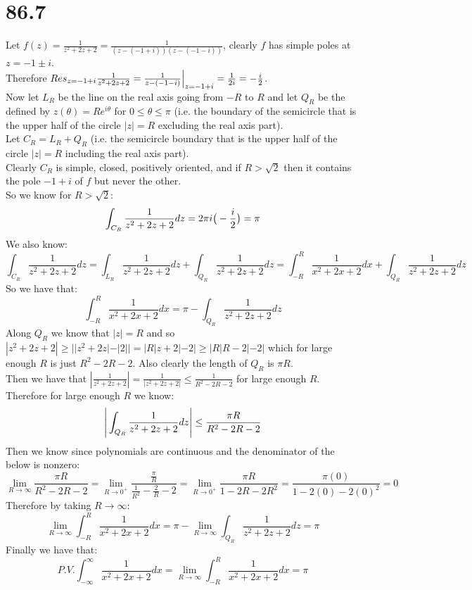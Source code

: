 \documentclass{article}
\begin{document}
\newpage
\section*{86.7}
\begin{center}
    \doublespacing
    Let $f(z) =\frac{1}{z^2 + 2z + 2} =\frac{1}{(z - (-1 + i))(z - (-1 - i))}$, clearly $f$ has simple poles at $z = -1\pm i$.
    \\Therefore $Res_{z = -1 + i}\frac{1}{z^2 + 2z + 2} =\frac{1}{z - (-1 - i)}\Big{|}_{z=-1+i} =\frac{1}{2i} = -\frac{i}{2}$.
    \\Now let $L_R$ be the line on the real axis going from $-R$ to $R$ and let $Q_R$ be the defined by $z(\theta) = Re^{i\theta}$ for $0\leq\theta\leq\pi$ (i.e. the boundary of the semicircle that is the upper half of the circle $|z| = R$ excluding the real axis part).
    \\Let $C_R = L_R + Q_R$ (i.e. the semicircle boundary that is the upper half of the circle $|z| = R$ including the real axis part).
    \\Clearly $C_R$ is simple, closed, positively oriented, and if $R >\sqrt{2}$ then it contains the pole $-1 + i$ of $f$ but never the other.
    \\So we know for $R >\sqrt{2}$:
    \[\int _{C_R}\frac{1}{z^2 + 2z + 2} dz = 2\pi i\big{(}-\frac{i}{2}\big{)} =\pi\]
    We also know:
    \[\int _{C_R}\frac{1}{z^2 + 2z + 2} dz =\int _{L_R}\frac{1}{z^2 + 2z + 2} dz +\int _{Q_R}\frac{1}{z^2 + 2z + 2} dz =\int _{-R}^R\frac{1}{x^2 + 2x + 2} dx +\int _{Q_R}\frac{1}{z^2 + 2z + 2} dz\]
    So we have that:
    \[\int _{-R}^R\frac{1}{x^2 + 2x + 2} dx =\pi -\int _{Q_R}\frac{1}{z^2 + 2z + 2} dz\]
    Along $Q_R$ we know that $|z| = R$ and so $|z^2 + 2z + 2|\geq ||z^2 + 2z| - |2|| = |R|z+2| - 2|\geq |R|R - 2| - 2|$ which for large enough $R$ is just $R^2 - 2R - 2$. Also clearly the length of $Q_R$ is $\pi R$.
    \\Then we have that $|\frac{1}{z^2 + 2z + 2}| =\frac{1}{|z^2 + 2z + 2|}\leq\frac{1}{R^2 - 2R - 2}$ for large enough $R$.
    \\Therefore for large enough $R$ we know:
    \[\Bigg{|}\int _{Q_R}\frac{1}{z^2 + 2z + 2} dz\Bigg{|}\leq\frac{\pi R}{R^2 - 2R - 2}\]
    Then we know since polynomials are continuous and the denominator of the below is nonzero:
    \[\lim _{R\rightarrow\infty}\frac{\pi R}{R^2 - 2R - 2} =\lim _{R\rightarrow 0^+}\frac{\frac{\pi}{R}}{\frac{1}{R^2} -\frac{2}{R} - 2} =\lim _{R\rightarrow 0^+}\frac{\pi R}{1 - 2R - 2R^2} =\frac{\pi (0)}{1 - 2(0) - 2(0)^2} = 0\]
    Therefore by taking $R\rightarrow\infty$:
    \[\lim _{R\rightarrow\infty}\int _{-R}^R\frac{1}{x^2 + 2x + 2} dx =\pi -\lim _{R\rightarrow\infty}\int _{Q_R}\frac{1}{z^2 + 2z + 2} dz =\pi\]
    Finally we have that:
    \[P.V.\int _{-\infty}^{\infty}\frac{1}{x^2 + 2x + 2} dx =\lim _{R\rightarrow\infty}\int _{-R}^R\frac{1}{x^2 + 2x + 2} dx =\pi\]
\end{center}
\end{document}
